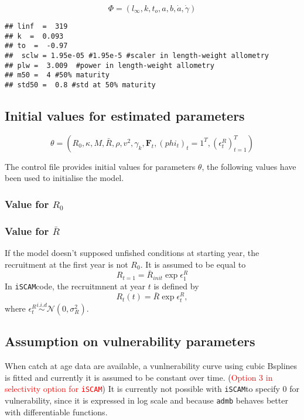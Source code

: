 \documentclass[a4paper]{article}\usepackage{graphicx, color}
\makeatletter
\newenvironment{kframe}{%
 \def\at@end@of@kframe{}%
 \ifinner\ifhmode%
  \def\at@end@of@kframe{\end{minipage}}%
  \begin{minipage}{\columnwidth}%
 \fi\fi%
 \def\FrameCommand##1{\hskip\@totalleftmargin \hskip-\fboxsep
 \colorbox{shadecolor}{##1}\hskip-\fboxsep
     \hskip-\linewidth \hskip-\@totalleftmargin \hskip\columnwidth}%
 \MakeFramed {\advance\hsize-\width
   \@totalleftmargin\z@ \linewidth\hsize
   \@setminipage}}%
 {\par\unskip\endMakeFramed%
 \at@end@of@kframe}
\newenvironment{knitrout}{}{} %
\newcommand{\iscam}{\texttt{iSCAM}}
\newcommand{\admb}{\texttt{admb} }
\newcommand{\com}[1]{\textcolor{red}{#1}}
\makeatother
\begin{document}
$$\Phi = (l_\infty, k, t_o,a,b,\dot{a},\dot{\gamma})$$
\begin{knitrout}
\color{fgcolor}\begin{kframe}
\begin{verbatim}
## linf  =  319
## k  =  0.093
## to  =  -0.97
##  sclw = 1.95e-05 #1.95e-5 #scaler in length-weight allometry
## plw =  3.009  #power in length-weight allometry
## m50 =  4 #50% maturity
## std50 =  0.8 #std at 50% maturity
\end{verbatim}
\end{kframe}
\end{knitrout}




\subsection{Initial values for estimated parameters}
$$\theta   =  (R_0,   \kappa,   M,  \bar{R},   \rho,  v^2,   \gamma_k,
\boldsymbol{F}_{t}, (phi_t)_t=1^T, (\epsilon_t^R)_{t=1}^T)$$



        
        The  control  file  provides  initial  values  for  parameters
        $\theta$, the  following values  have been used  to initialise
        the model.

\subsubsection*{Value for $R_0$}


\subsubsection*{Value for $\bar{R}$}
If the  model doesn't supposed  unfished conditions at  starting year,
the recruitment at  the first year is  not $R_0$. It is  assumed to be
equal to
$$R_{t=1} = \bar{R}_{init} \exp{\epsilon_1^R}$$
In \iscam code, the recruitmnent at year $t$ is defined by
$$R_t(t)=\bar{R} \exp{\epsilon_t^R}, $$
  where $\epsilon_t^R\overset{i.i.d}{\sim} \mathcal{N}(0,\sigma_R^2)$.


\subsection{Assumption on vulnerability parameters}
When catch at age data are available, a vunlnerability curve using cubic Bsplines is fitted and currently it is assumed to be constant over time. (\com{Option 3 in selectivity option for \iscam})
It is currently not possible with \iscam to specify 0 for vulnerability, since it is expressed in log scale and because \admb behaves better with differentiable functions.
\end{document}

